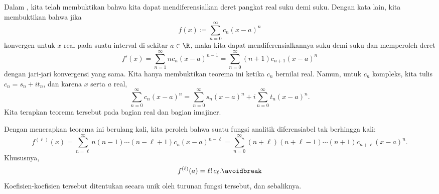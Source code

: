 Dalam , kita telah membuktikan bahwa kita dapat
mendiferensialkan deret pangkat real suku demi suku.  Dengan kata lain,
kita membuktikan bahwa jika
\begin{equation*}
f(x) \coloneqq \sum_{n=0}^\infty c_n {(x-a)}^n
\end{equation*}
konvergen untuk $x$ real pada suatu interval di sekitar $a \in \R$, maka kita dapat mendiferensialkannya
suku demi suku dan memperoleh deret
\begin{equation*}
f'(x) =
\sum_{n=1}^\infty n c_n {(x-a)}^{n-1}
=
\sum_{n=0}^\infty (n+1)c_{n+1} {(x-a)}^{n} 
\end{equation*}
dengan jari-jari konvergensi yang sama.
Kita hanya membuktikan teorema ini ketika $c_n$ bernilai real.
Namun, untuk $c_n$ kompleks,
kita tulis
$c_n = s_n + i t_n$, dan karena $x$ serta $a$ real,
\begin{equation*}
\sum_{n=0}^\infty c_n {(x-a)}^n
=
\sum_{n=0}^\infty s_n {(x-a)}^n
+
i
\sum_{n=0}^\infty t_n {(x-a)}^n .
\end{equation*}
Kita terapkan teorema tersebut pada bagian real dan
bagian imajiner.

Dengan menerapkan teorema ini berulang kali, kita peroleh bahwa suatu
fungsi analitik diferensiabel tak berhingga kali:
\begin{equation*}
f^{(\ell)}(x)
=
\sum_{n=\ell}^\infty n(n-1)\cdots(n-\ell+1)c_n {(x-a)}^{n-\ell}
=
\sum_{n=0}^\infty (n+\ell)(n+\ell-1)\cdots (n+1) c_{n+\ell} {(x-a)}^{n} .
\end{equation*}
Khususnya,
\begin{equation} \label{eq:formulaforpscoeffs}
f^{(\ell)}(a) = \ell! \, c_\ell .
\avoidbreak
\end{equation}
Koefisien-koefisien tersebut ditentukan secara unik oleh turunan
fungsi tersebut, dan sebaliknya.

